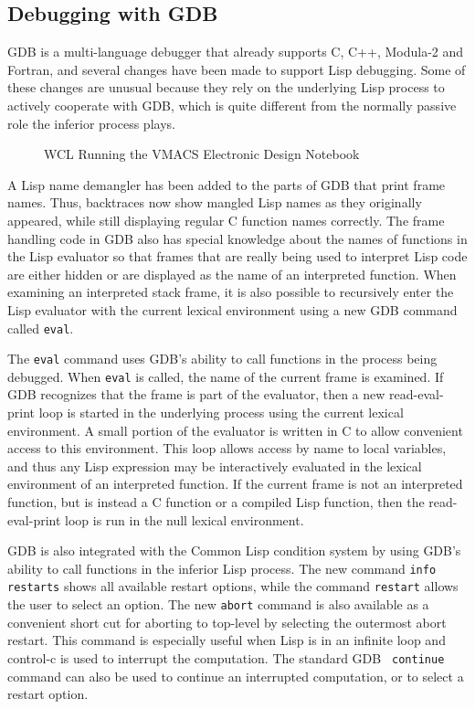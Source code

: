 \subsection{Debugging with GDB}

GDB is a multi-language debugger that already supports C, C++,
Modula-2 and Fortran, and several changes have been made to support
Lisp debugging. Some of these changes are unusual because they rely on
the underlying Lisp process to actively cooperate with GDB, which is
quite different from the normally passive role the inferior process plays.

\begin{figure*}[t]
  \caption{WCL Running the VMACS Electronic Design Notebook}
  \label{solenoid}
\end{figure*}

A Lisp name demangler has been added to the parts of GDB that print
frame names. Thus, backtraces now show mangled Lisp names as they
originally appeared, while still displaying regular C function names
correctly. The frame handling code in GDB also has special knowledge
about the names of functions in the Lisp evaluator so that frames that
are really being used to interpret Lisp code are either hidden or
are displayed as the name of an interpreted function.  When examining an
interpreted stack frame, it is also possible to recursively enter the
Lisp evaluator with the current lexical environment using a new GDB
command called {\tt eval}.

The {\tt eval} command uses GDB's ability to call functions in the
process being debugged. When {\tt eval} is called, the name of the
current frame is examined. If GDB recognizes that the frame is part of
the evaluator, then a new read-eval-print loop is started in the
underlying process using the current lexical environment. A small
portion of the evaluator is written in C to allow convenient access to
this environment.  This loop allows access by name to local variables,
and thus any Lisp expression may be interactively evaluated in the
lexical environment of an interpreted function.  If the current frame
is not an interpreted function, but is instead a C function or a
compiled Lisp function, then the read-eval-print loop is run in the
null lexical environment.

GDB is also integrated with the Common Lisp condition system by using
GDB's ability to call functions in the inferior Lisp process.  The new
command {\tt info restarts} shows all available restart options, while
the command {\tt restart} allows the user to select an option.  The
new {\tt abort} command is also available as a convenient short cut
for aborting to top-level by selecting the outermost abort restart.
This command is especially useful when Lisp is in an infinite loop and
control-c is used to interrupt the computation.  The standard GDB {\tt
continue} command can also be used to continue an interrupted
computation, or to select a restart option.

